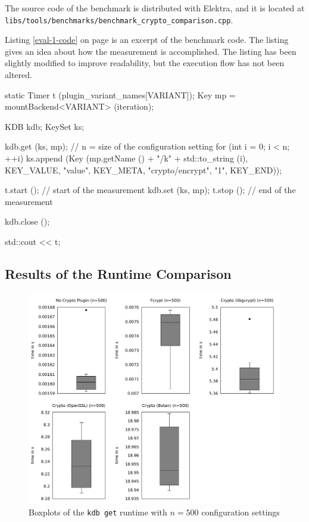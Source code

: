 The source code of the benchmark is distributed with Elektra, and it is located at\\
\texttt{libs/tools/benchmarks/benchmark\_crypto\_comparison.cpp}.

Listing \ref{eval-1-code} on page \pageref{eval-1-code} is an excerpt of the benchmark code.
The listing gives an idea about how the measurement is accomplished.
The listing has been slightly modified to improve readability, but the execution flow has not been altered.

\begin{code}[label=eval-1-code,language=C,caption={Excerpt of Benchmark 1}]
static Timer t (plugin_variant_names[VARIANT]);
Key mp = mountBackend<VARIANT> (iteration);
{
  KDB kdb;
  KeySet ks;

  kdb.get (ks, mp);
  // n = size of the configuration setting
  for (int i = 0; i < n; ++i)
  {
    ks.append (Key (mp.getName () + "/k" + std::to_string (i),
      KEY_VALUE, "value",
      KEY_META, "crypto/encrypt", "1",
      KEY_END));
  }

  t.start (); // start of the measurement
  kdb.set (ks, mp);
  t.stop (); // end of the measurement

  kdb.close ();
}
std::cout << t;
\end{code}

  \subsection{Results of the Runtime Comparison}


\begin{figure}[h]
\center
\caption{Boxplots of the \texttt{kdb get} runtime with $n = 500$ configuration settings}
\label{eval-boxplot-get}
\includegraphics[width=\columnwidth]{plots/boxplot_500_get.pdf}
\end{figure}


